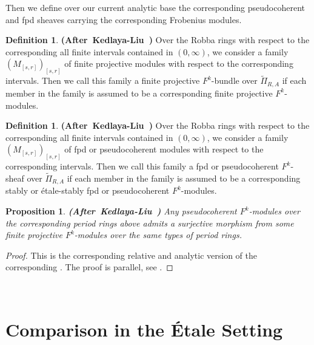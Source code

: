 \documentclass[12pt]{amsart}
\newtheorem{proposition}[theorem]{Proposition}
\theoremstyle{definition}
\newtheorem{definition}[theorem]{Definition}
\numberwithin{equation}{section}
\begin{document}
\indent Then we define over our current analytic base the corresponding pseudocoherent and fpd sheaves carrying the corresponding Frobenius modules.

\begin{definition}\mbox{\bf{(After Kedlaya-Liu \cite[Definition 4.4.6]{KL2})}}
Over the Robba rings with respect to the corresponding all finite intervals contained in $(0,\infty)$, we consider a family $(M_{[s,r]})_{[s,r]}$ of finite projective modules with respect to the corresponding intervals. Then we call this family a finite projective $F^k$-bundle over $\widetilde{\Pi}_{R,A}$ if each member in the family is assumed to be a corresponding finite projective $F^k$-modules.	
\end{definition}

\begin{definition}\mbox{\bf{(After Kedlaya-Liu \cite[Definition 4.4.6]{KL2})}}
Over the Robba rings with respect to the corresponding all finite intervals contained in $(0,\infty)$, we consider a family $(M_{[s,r]})_{[s,r]}$ of fpd or pseudocoherent modules with respect to the corresponding intervals. Then we call this family a fpd or pseudocoherent $F^k$-sheaf over $\widetilde{\Pi}_{R,A}$ if each member in the family is assumed to be a corresponding stably or \'etale-stably fpd or pseudocoherent $F^k$-modules.	
\end{definition}



\begin{proposition} \mbox{\bf{(After Kedlaya-Liu \cite[Lemma 4.4.8]{KL2})}}
Any pseudocoherent $F^k$-modules over the corresponding period rings above admits a surjective morphism from some finite projective $F^k$-modules over the same types of period rings.	
\end{proposition}


\begin{proof}
This is the corresponding relative and analytic version of the corresponding \cite[Lemma 4.4.8]{KL2}. The proof is parallel, see \cite[Lemma 4.4.8]{KL2}.	
\end{proof}



\







\section{Comparison in the \'Etale Setting}
\end{document}
